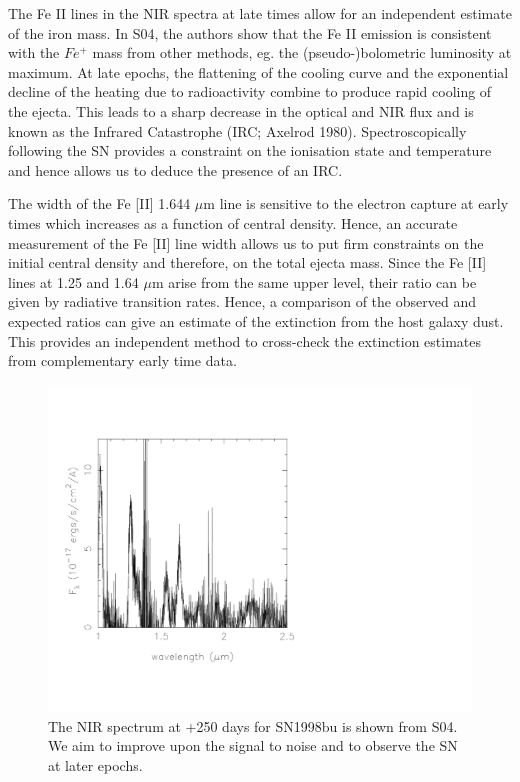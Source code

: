 \documentclass[11pt]{article}
\begin{document}
The Fe II lines in the NIR spectra at late times allow for an independent estimate of the iron mass. In S04, the authors show that the Fe II emission is consistent with the $Fe^{+}$  mass from other methods, eg. the (pseudo-)bolometric luminosity at maximum.
 At late epochs, the flattening of the cooling curve and the exponential decline of the heating due to radioactivity combine to produce rapid cooling of the ejecta. This leads to a sharp decrease in the optical and NIR flux and is known as the Infrared Catastrophe (IRC; Axelrod 1980). Spectroscopically following the SN provides a constraint on the ionisation state and temperature and hence allows us to deduce the presence of an IRC. 
 
The width of the Fe [II] 1.644 $\mu$m line is sensitive to the electron capture at early times which increases as a function of central density. Hence, an accurate measurement of the Fe [II] line width allows us to put firm constraints on the initial central density and therefore, on the total ejecta mass.  
Since the Fe [II] lines at 1.25 and 1.64 $\mu$m arise from the same upper level, their ratio can be given by radiative transition rates. Hence, a comparison of the observed and expected ratios can give an estimate of the extinction from the host galaxy dust. This provides an independent method to cross-check the extinction estimates from complementary early time data. 

\begin{figure}
\includegraphics[width=.8\textwidth]{../0570fig1.pdf}
\caption{The NIR spectrum at +250 days for SN1998bu is shown from S04. We aim to improve upon the signal to noise and to observe the SN at later epochs. }%
\label{fig:s04}
\end{figure}
\end{document}
